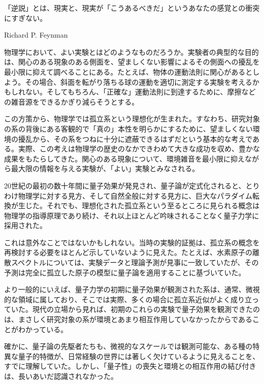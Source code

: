 \label{chap:1}
\begin{flushright}\begin{minipage}{.65\linewidth}\small
「逆説」とは、現実と、現実が「こうあるべきだ」というあなたの感覚との衝突にすぎない。
\begin{flushright}Richard P. Feynman\end{flushright}
\end{minipage}\end{flushright}

\hypertarget{srcpage:1}{}\label{srcpage:1}物理学において、よい実験とはどのようなものだろうか。実験者の典型的な目的は、関心のある現象のある側面を、望ましくない影響によるその側面への擾乱を最小限に抑えて調べることにある。たとえば、物体の運動法則に関心があるとしよう。その場合、斜面を転がり落ちる球の運動を適切に測定する実験を考えるかもしれない。そしてもちろん、「正確な」運動法則に到達するために、摩擦などの雑音源をできるかぎり減らそうとする。

この方策から、物理学では孤立系という理想化が生まれた。すなわち、研究対象の系の背後にある客観的で「真の」本性を明らかにするために、望ましくない環境の擾乱から、その系をつねに十分に遮蔽できるはずだという基本的な考えである。実際、この考えは物理学の歴史のなかできわめて大きな成功を収め、豊かな成果をもたらしてきた。関心のある現象について、環境雑音を最小限に抑えながら最大限の情報を与える実験が、「よい」実験とみなされる。

20世紀の最初の数十年間に量子効果が発見され、量子論が定式化されると、とりわけ物理学に対する見方、そして自然全般に対する見方に、巨大なパラダイム転換が生じた。それでも、理想化された孤立系という至るところに見られる概念は物理学の指導原理であり続け、それ以上ほとんど吟味されることなく量子力学に採用された。

これは意外なことではないかもしれない。当時の実験的証拠は、孤立系の概念を再検討する必要をほとんど示していないように見えた。たとえば、水素原子の離散スペクトルについては、実験データと理論予測が見事に一致していたが、その予測は完全に孤立した原子の模型に量子論を適用することに基づいていた。

より一般的にいえば、量子力学の初期に量子効果が観測された系は、通常、微視的な領域に属しており、そこでは実際、多くの場合に孤立系近似がよく成り立っていた。現代の立場から見れば、初期のこれらの実験で量子効果を観測できたのは、まさしく研究対象の系が環境とあまり相互作用していなかったからであることがわかっている。

\hypertarget{srcpage:2}{}\label{srcpage:2}確かに、量子論の先駆者たちも、微視的なスケールでは観測可能な、ある種の特異な量子的特徴が、日常経験の世界には著しく欠けているように見えることを、すでに理解していた。しかし、「量子性」の喪失と環境との相互作用の結び付きは、長いあいだ認識されなかった。

